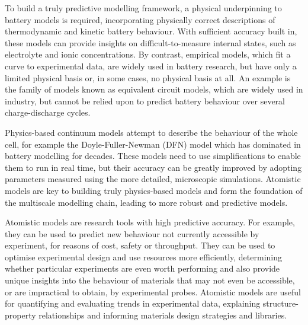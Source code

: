 \documentclass[../main.tex]{subfiles}
\begin{document}
To build a truly predictive modelling framework, a physical underpinning to battery models is required, incorporating physically correct descriptions of thermodynamic and kinetic battery behaviour. With sufficient accuracy built in, these models can provide insights on difficult-to-measure internal states, such as electrolyte and ionic concentrations. By contrast, empirical models, which fit a curve to experimental data, are widely used in battery research, but have only a limited physical basis or, in some cases, no physical basis at all. An example is the family of models known as equivalent circuit models, which are widely used in industry, but cannot be relied upon to predict battery behaviour over several charge-discharge cycles.

Physics-based continuum models attempt to describe the behaviour of the whole cell, for example the Doyle-Fuller-Newman (DFN) model \cite{doyle1993modeling,fuller1994simulation,Fuller1994a,Doyle1995,Newman2004} which has dominated in battery modelling for decades. These models need to use simplifications to enable them to run in real time, but their accuracy can be greatly improved by adopting parameters measured using the more detailed, microscopic simulations. Atomistic models are key to building truly physics-based models and form the foundation of the multiscale modelling chain, leading to more robust and predictive models.
 
Atomistic models are research tools with high predictive accuracy. For example, they can be used to predict new behaviour not currently accessible by experiment, for reasons of cost, safety or throughput. They can be used to optimise experimental design and use resources more efficiently, determining whether particular experiments are even worth performing and also provide unique insights into the behaviour of materials that may not even be accessible, or are impractical to obtain, by experimental probes. Atomistic models are useful for quantifying and evaluating trends in experimental data, explaining structure-property relationships and informing materials design strategies and libraries.
\end{document}

